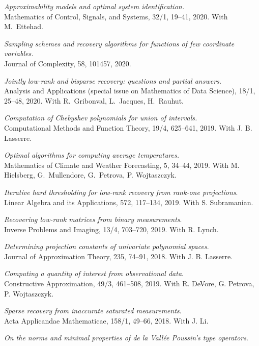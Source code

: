 \documentclass[11pt]{article}
\begin{document}
\item {\sl Approximability models and optimal system identification.}\\
Mathematics of Control, Signals, and Systems, 32/1, 19--41, 2020.
With M.~Ettehad.
\item {\sl Sampling schemes and recovery algorithms for functions of few coordinate variables.}\\
Journal of Complexity, 58, 101457, 2020.
\item {\sl Jointly low-rank and bisparse recovery: questions and partial answers.}\\
Analysis and Applications (special issue on Mathematics of Data Science), 18/1, 25--48, 2020.
With R.~Gribonval, L.~Jacques, H.~Rauhut.
\item {\sl Computation of Chebyshev polynomials for union of intervals.}\\
Computational Methods and Function Theory, 19/4, 625--641, 2019.
With J. B. Lasserre.
\item {\sl Optimal algorithms for computing average temperatures.}\\
Mathematics of Climate and Weather Forecasting, 5, 34--44, 2019.
With M. Hielsberg, G.~Mullendore, G.~Petrova, P. Wojtaszczyk.
\item {\sl Iterative hard thresholding for low-rank recovery from rank-one projections}.\\
Linear Algebra and its Applications, 572, 117--134, 2019. With S. Subramanian.
\item {\sl Recovering low-rank matrices from binary measurements}.\\
Inverse Problems and Imaging, 13/4, 703--720, 2019. 
With R. Lynch. 
\item {\sl Determining projection constants of univariate polynomial spaces}.\\
Journal of Approximation Theory, 235, 74--91, 2018.
With J. B. Lasserre.
\item {\sl Computing a quantity of interest from observational data}.\\
Constructive Approximation, 49/3, 461--508, 2019. With R. DeVore, G. Petrova, P. Wojtaszczyk.
\item {\sl Sparse recovery from inaccurate saturated measurements}.\\
Acta Applicandae Mathematicae, 158/1, 49--66, 2018. With J. Li.
\item {\sl On the norms and minimal properties of de la Vall\'ee Poussin's type operators}.\\
\end{document}
